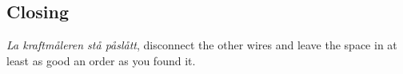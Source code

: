 \documentclass[../Elmag-labhefte-2020.tex]{subfiles}
\begin{document}
%


\subsection{Closing}
\emph{La kraftmåleren stå påslått}, disconnect the other wires and leave the space in at least as good an order as you found it.
\end{document}
